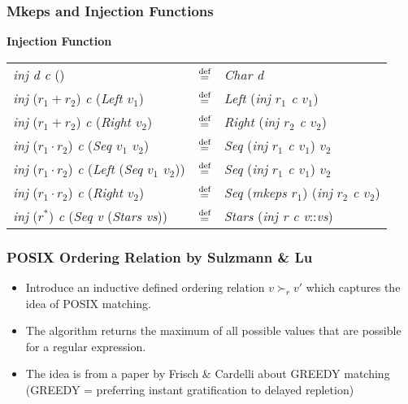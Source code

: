 \documentclass{beamer}
\newcommand{\dn}{\stackrel{\mbox{\scriptsize def}}{=}}
\begin{document}
	
	\begin{frame}
	\frametitle{Mkeps and Injection Functions}
	
	\textbf{Injection Function}
	\begin{tabular}{ l l l }
		\textit{inj d c} () & $\dn$ & \textit{Char d}\\
		\textit{inj} ($r_1 + r_2$) \textit{c} (\textit{Left $v_1$}) & $\dn$ & \textit{Left} (\textit{inj $r_1$ c $v_1$})\\
		\textit{inj} ($r_1 + r_2$) \textit{c} (\textit{Right $v_2$}) & $\dn$ & \textit{Right} (\textit{inj $r_2$ c $v_2$})\\
		\textit{inj} ($r_1 \cdot r_2$) \textit{c} (\textit{Seq $v_1$ $v_2$}) & $\dn$ & \textit{Seq} (\textit{inj $r_1$ c $v_1$}) $v_2$\\
		\textit{inj} ($r_1 \cdot r_2$) \textit{c} (\textit{Left} (\textit{Seq $v_1$ $v_2$})) & $\dn$ & \textit{Seq} (\textit{inj $r_1$ c $v_1$}) $v_2$\\
		\textit{inj} ($r_1 \cdot r_2$) \textit{c} (\textit{Right $v_2$}) & $\dn$ & \textit{Seq} (\textit{mkeps $r_1$}) (\textit{inj $r_2$ c $v_2$})\\
		\textit{inj} ($r^*$) \textit{c} (\textit{Seq v} (\textit{Stars vs})) & $\dn$ & \textit{Stars} (\textit{inj r c v}::\textit{vs})
	\end{tabular}
	
	\end{frame}	
		
	
	\begin{frame}
	\frametitle{POSIX Ordering Relation by Sulzmann \& Lu}
	
	\begin{itemize}
	\item Introduce an inductive defined ordering relation 
	$v \succ_r v'$ which captures the idea of POSIX matching.
	
	\item The algorithm returns the maximum of all possible values 
	that are possible for a regular expression.
	
	\item The idea is from a paper by Frisch \& Cardelli about 
	GREEDY matching (GREEDY = preferring instant gratification 
	to delayed repletion)
	
	
	\end{itemize}
	\end{frame}
	
\end{document}

